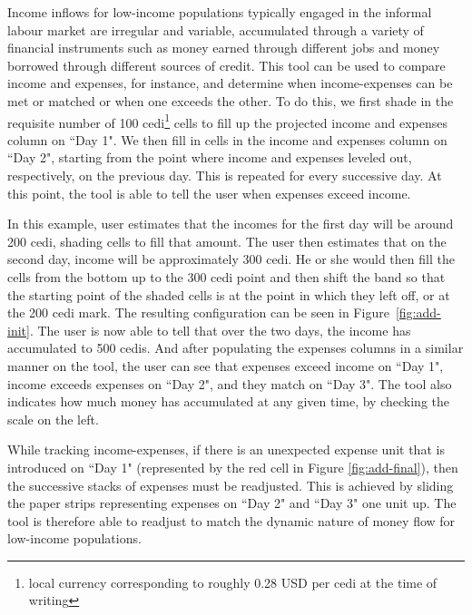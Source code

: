 \documentclass{sig-alternate}
\begin{document}
Income inflows for low-income populations typically engaged in the informal labour market are irregular and variable, accumulated through a variety of financial instruments such as money earned through different jobs and money borrowed through different sources of credit. This tool can be used to compare income and expenses, for instance, and determine when income-expenses can be met or matched or when one exceeds the other. To do this, we first shade in the requisite number of 100 cedi\footnote{local currency corresponding to roughly 0.28 USD per cedi at the time of writing} cells to fill up the projected income and expenses column on ``Day 1". We then fill in cells in the income and expenses column on ``Day 2", starting from the point where income and expenses leveled out, respectively, on the previous day. This is repeated for every successive day. At this point, the tool is able to tell the user when expenses exceed income. 

In this example, user estimates that the incomes for the first day will be around 200 cedi, shading cells to fill that amount. The user then estimates that on the second day, income will be approximately 300 cedi. He or she would then fill the cells from the bottom up to the 300 cedi point and then shift the band so that the starting point of the shaded cells is at the point in which they left off, or at the 200 cedi mark. The resulting configuration can be seen in Figure~\ref{fig:add-init}. The user is now able to tell that over the two days, the income has accumulated to 500 cedis. And after populating the expenses columns in a similar manner on the tool, the user can see that expenses exceed income on ``Day 1", income exceeds expenses on ``Day 2", and they match on ``Day 3". The tool also indicates how much money has accumulated at any given time, by checking the scale on the left.
 
While tracking income-expenses, if there is an unexpected expense unit that is introduced on ``Day 1" (represented by the red cell in Figure \ref{fig:add-final}), then the successive stacks of expenses must be readjusted. This is achieved by sliding the paper strips representing expenses on ``Day 2" and ``Day 3" one unit up. The tool is therefore able to readjust to match the dynamic nature of money flow for low-income populations.
\end{document}
